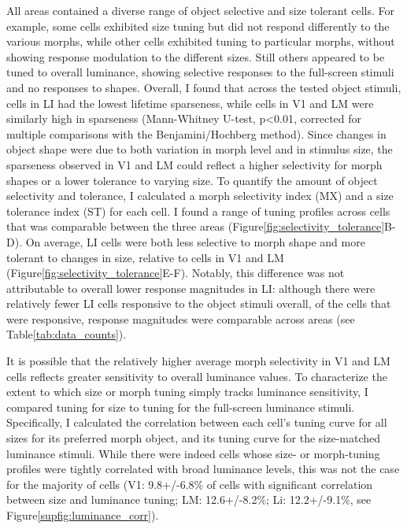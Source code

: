All areas contained a diverse range of object selective and size tolerant cells. For example, some cells exhibited size tuning but did not respond differently to the various morphs, while other cells exhibited tuning to particular morphs, without showing response modulation to the different sizes. Still others appeared to be tuned to overall luminance, showing selective responses to the full-screen stimuli and no responses to shapes. Overall, I found that across the tested object stimuli, cells in LI had the lowest lifetime sparseness, while cells in V1 and LM were similarly high in sparseness (Mann-Whitney U-test, p<0.01, corrected for multiple comparisons with the Benjamini/Hochberg method). Since changes in object shape were due to both variation in morph level and in stimulus size, the sparseness observed in V1 and LM could reflect a higher selectivity for morph shapes or a lower tolerance to varying size. To quantify the amount of object selectivity and tolerance, I calculated a morph selectivity index (MX) and a size tolerance index (ST) for each cell\cite{Zoccolan2007}. I found a range of tuning profiles across cells that was comparable between the three areas (Figure\ref{fig:selectivity_tolerance}B-D). On average, LI cells were both less selective to morph shape and more tolerant to changes in size, relative to cells in V1 and LM (Figure\ref{fig:selectivity_tolerance}E-F). Notably, this difference was not attributable to overall lower response magnitudes in LI: although there were relatively fewer LI cells responsive to the object stimuli overall, of the cells that were responsive, response magnitudes were comparable across areas (see Table\ref{tab:data_counts}).

It is possible that the relatively higher average morph selectivity in V1 and LM cells reflects greater sensitivity to overall luminance values. To characterize the extent to which size or morph tuning simply tracks luminance sensitivity, I compared tuning for size to tuning for the full-screen luminance stimuli. Specifically, I calculated the correlation between each cell's tuning curve for all sizes for its preferred morph object, and its tuning curve for the size-matched luminance stimuli. While there were indeed cells whose size- or morph-tuning profiles were tightly correlated with broad luminance levels, this was not the case for the majority of cells (V1: 9.8+/-6.8\% of cells with significant correlation between size and luminance tuning; LM: 12.6+/-8.2\%; Li: 12.2+/-9.1\%, see Figure\ref{supfig:luminance_corr}). 

